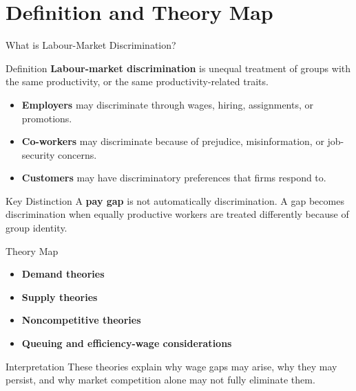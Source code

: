 \documentclass[aspectratio=169]{beamer}
\begin{document}
\section{Definition and Theory Map}

\begin{frame}{What is Labour-Market Discrimination?}
\transfade
\begin{block}{Definition}
\textbf{Labour-market discrimination} is unequal treatment of groups with the same productivity, or the same productivity-related traits.
\end{block}

\begin{itemize}
  \item \textbf{Employers} may discriminate through wages, hiring, assignments, or promotions.
  \item \textbf{Co-workers} may discriminate because of prejudice, misinformation, or job-security concerns.
  \item \textbf{Customers} may have discriminatory preferences that firms respond to.
\end{itemize}

\begin{block}{Key Distinction}
A \textbf{pay gap} is not automatically discrimination. A gap becomes discrimination when equally productive workers are treated differently because of group identity.
\end{block}
\end{frame}

\begin{frame}{Theory Map}
\transfade
\begin{itemize}
  \item \textbf{Demand theories}
  \item \textbf{Supply theories}
  \item \textbf{Noncompetitive theories}
  \item \textbf{Queuing and efficiency-wage considerations}
\end{itemize}

\begin{block}{Interpretation}
These theories explain why wage gaps may arise, why they may persist, and why market competition alone may not fully eliminate them.
\end{block}
\end{frame}
\end{document}
